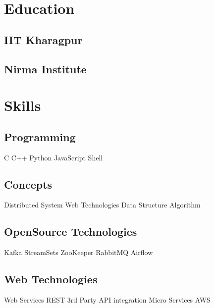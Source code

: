 \documentclass[]{deedy-resume-openfont}
\begin{document}
\begin{minipage}[t]{0.33\textwidth} 


\section{Education} 

\subsection{IIT Kharagpur}
\sectionsep

\subsection{Nirma Institute}
\sectionsep



\section{Skills}

\subsection{Programming}
C \textbullet{} C++  \textbullet{}  Python  \textbullet{} JavaScript \textbullet{} Shell
\vspace{2mm} 

\subsection{Concepts}
Distributed System \textbullet{} Web Technologies \textbullet{} Data Structure \textbullet{} Algorithm
\vspace{2mm} 

\subsection{OpenSource Technologies}
Kafka \textbullet{} StreamSets  \textbullet{}  ZooKeeper  \textbullet{} RabbitMQ \textbullet{} Airflow
\vspace{2mm} 

\subsection{Web Technologies}
Web Services \textbullet{} REST  \textbullet{} 3rd Party API integration \textbullet{} Micro Services  \textbullet{} AWS
\vspace{2mm} 


\end{minipage}
\end{document}
